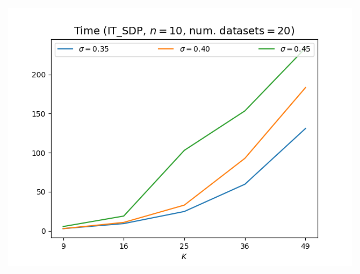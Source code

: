 \documentclass{article}
\begin{document}
\begin{figure}[h!]
        ~ 
        \begin{subfigure}[t]{0.3\textwidth}
            \centering
            \includegraphics[width=\textwidth]{4/Time.png}
            \caption{}
        \end{subfigure}
    \end{figure}
\end{document}
